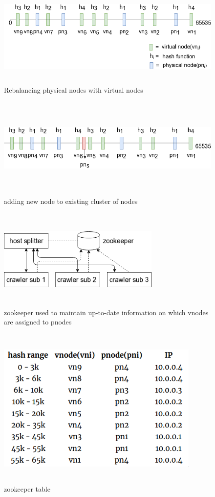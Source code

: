 \begin{figure}[h!]
  \centering
  \includegraphics[width=12cm,height=5cm,keepaspectratio]{../media/crawler/vnodesplit2.png}
  \caption{Rebalancing physical nodes with virtual nodes}
  \label{fig:vnodesplit2}
\end{figure}

\begin{figure}[h!]
  \centering
  \includegraphics[width=12cm,height=5cm,keepaspectratio]{../media/crawler/addingnode.png}
  \caption{adding new node to existing cluster of nodes}
  \label{fig:addingnode}
\end{figure}

\begin{figure}[h!]
  \centering
  \includegraphics[width=8cm,height=5cm,keepaspectratio]{../media/crawler/zookeeper.png}
  \caption{zookeeper used to maintain up-to-date information on which vnodes are assigned to pnodes}
  \label{fig:zookeeper}
\end{figure}

\begin{figure}[h!]
  \centering
  \includegraphics[width=10cm,height=8cm,keepaspectratio]{../media/crawler/zookeeper_info.png}
  \caption{zookeeper table}
  \label{fig:zookeeper_info}
\end{figure}

\pagebreak
